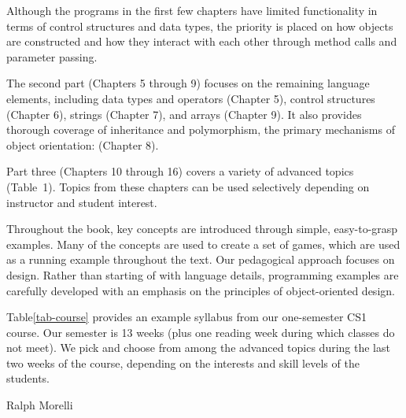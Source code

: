 Although the programs in the first few chapters have limited
functionality in terms of control structures and data types, the
priority is placed on how objects are constructed and how they
interact with each other through method calls and parameter passing.

The second part (Chapters 5 through 9) focuses on the remaining
language elements, including data types and operators (Chapter 5),
control structures (Chapter 6), strings (Chapter 7), and arrays
(Chapter 9).  It also provides thorough coverage of inheritance and
polymorphism, the primary mechanisms of object orientation: (Chapter
8).  

Part three (Chapters 10 through 16) covers a variety of advanced
topics (Table~1).  Topics from these chapters can be used selectively
depending on instructor and student interest.

Throughout the book, key concepts are introduced through simple,
easy-to-grasp examples.  Many of the concepts are used to create a set
of games, which are used as a running example throughout the text.
Our pedagogical approach focuses on design. Rather than starting of
with language details, programming examples are carefully developed
with an emphasis on the principles of object-oriented design.

Table\ref{tab-course} provides an example syllabus from our
one-semester CS1 course.  Our semester is 13 weeks (plus one reading
week during which classes do not meet). We  pick and choose from among
the advanced topics during the last two weeks of the course, depending
on the interests and skill levels of the students.

\vspace*{2pc}
\noindent Ralph Morelli\\
\date{\today}


